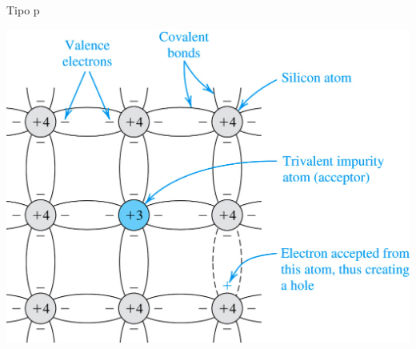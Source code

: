 \documentclass[xcolor={usenames,svgnames,dvipsnames}]{beamer}
\begin{document}
\begin{frame}[label={sec:org8ba7297}]{Tipo p}
\begin{center}
\includegraphics[width=.9\linewidth]{../figs/DopajeP.jpg}
\end{center}
\end{frame}
\end{document}
